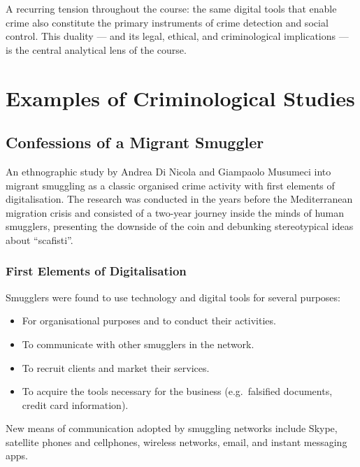 \documentclass[11pt,a4paper,openany]{report}
\theoremstyle{definition}
\theoremstyle{plain}
\theoremstyle{remark}
\begin{document}
\begin{keypoint}
A recurring tension throughout the course: the same digital tools that enable crime also constitute the primary instruments of crime detection and social control. This duality --- and its legal, ethical, and criminological implications --- is the central analytical lens of the course.
\end{keypoint}


\chapter{Examples of Criminological Studies}

\section{Confessions of a Migrant Smuggler}

An ethnographic study by Andrea Di Nicola and Giampaolo Musumeci into migrant smuggling as a classic organised crime activity with first elements of digitalisation. The research was conducted in the years before the Mediterranean migration crisis and consisted of a two-year journey inside the minds of human smugglers, presenting the downside of the coin and debunking stereotypical ideas about ``scafisti''.

\subsection{First Elements of Digitalisation}

Smugglers were found to use technology and digital tools for several purposes:

\begin{itemize}
    \item For organisational purposes and to conduct their activities.
    \item To communicate with other smugglers in the network.
    \item To recruit clients and market their services.
    \item To acquire the tools necessary for the business (e.g.\ falsified documents, credit card information).
\end{itemize}

New means of communication adopted by smuggling networks include Skype, satellite phones and cellphones, wireless networks, email, and instant messaging apps.
\end{document}
